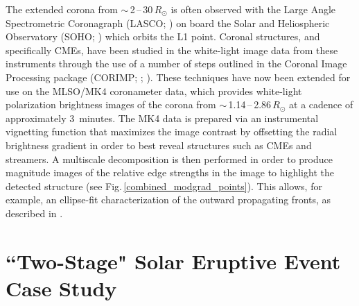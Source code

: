 \documentclass[namedreferences]{solarphysics}
\begin{document}
\begin{article}
The extended corona from $\sim$\,2\,--\,30\,$R_{\odot}$ is often observed with the Large Angle Spectrometric Coronagraph (LASCO; )  on board the Solar and Heliospheric Observatory (SOHO; ) which orbits the L1 point. Coronal structures, and specifically CMEs, have been studied in the white-light image data from these instruments through the use of a number of steps outlined in the Coronal Image Processing package (CORIMP; ; ). These techniques have now been extended for use on the MLSO/MK4 coronameter data, which provides white-light polarization brightness images of the corona from $\sim$\,1.14\,--\,2.86\,$R_{\odot}$ at a cadence of approximately 3~minutes. The MK4 data is prepared via an instrumental vignetting function that maximizes the image contrast by offsetting the radial brightness gradient in order to best reveal structures such as CMEs and streamers. A multiscale decomposition is then performed in order to produce magnitude images of the relative edge strengths in the image to highlight the detected structure (see Fig.\,\ref{combined_modgrad_points}). This allows, for example, an ellipse-fit characterization of the outward propagating fronts, as described in .



\section{``Two-Stage" Solar Eruptive Event Case Study}
\label{sect:event}


\end{article}
\end{document}
